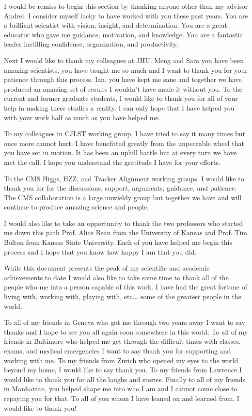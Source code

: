 \begin{frontmatter}
\begin{acknowledgement}
I would be remiss to begin this section by thanking anyone other than my advisor Andrei. I consider myself lucky to have worked with you these past years. You are a brilliant scientist with vision, insight, and determination. You are a great educator who gave me guidance, motivation, and knowledge. You are a fantastic leader instilling confidence, organization, and productivity.

Next I would like to thank my colleagues at JHU. Meng and Sara you have been amazing scientists, you have taught me so much and I want to thank you for your patience through this process. Ian, you have kept me sane and together we have produced an amazing set of results I wouldn't have made it without you. To the current and former graduate students, I would like to thank you for all of your help in making these studies a reality. I can only hope that I have helped you with your work half as much as you have helped me.

To my colleagues in CJLST working group, I have tried to say it many times but once more cannot hurt. I have benefitted greatly from the impeccable wheel that you have set in motion. It has been an uphill battle but at every turn we have met the call. I hope you understand the gratitude I have for your efforts.

To the CMS Higgs, HZZ, and Tracker Alignment working groups. I would like to thank you for for the discussions, support, arguments, guidance, and patience. The CMS collaboration is a large unwieldy group but together we have and will continue to produce amazing science and people.

I would also like to take an opportunity to thank the two professors who started me down this path Prof. Alice Bean from the University of Kansas and Prof. Tim Bolton from Kansas State University. Each of you have helped me begin this process and I hope that you know how happy I am that you did.

While this document presents the peak of my scientific and academic achievements to date I would also like to take some time to thank all of the people who me into a person capable of this work. I have had the great fortune of living with, working with, playing with, etc... some of the greatest people in the world. 

To all of my friends in Geneva who got me through two years away I want to say thanks and I hope to see you all again soon somewhere in this world. To all of my friends in Baltimore who helped me get through the difficult times with classes, exams, and medical emergencies I want to say thank you for supporting and working with me. To my friends from Zurich who opened my eyes to the world beyond my home, I would like to say thank you. To my friends from Lawrence I would like to thank you for all the laughs and stories. Finally to all of my friends in Manhattan, you helped shape me into who I am and I cannot come close to repaying you for that. To all of you whom I have leaned on and learned from, I would like to thank you!


\end{acknowledgement}
\end{frontmatter}
